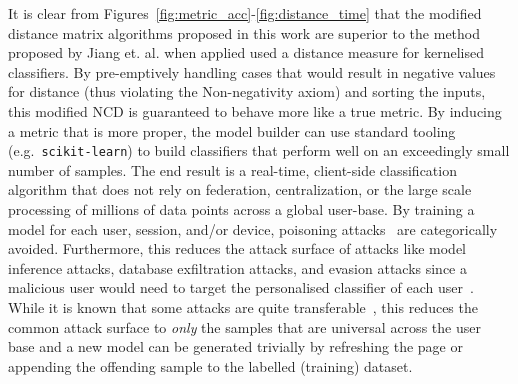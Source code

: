 \documentclass[preprint,12pt]{elsarticle}
\begin{document}
It is clear from Figures~\ref{fig:metric_acc}-\ref{fig:distance_time} that the modified distance matrix algorithms proposed in this work are superior to the method proposed by Jiang et. al. when applied used a distance measure for kernelised classifiers. 
By pre-emptively handling cases that would result in negative values for distance (thus violating the Non-negativity axiom) and sorting the inputs, this modified NCD is guaranteed to behave more like a true metric. 
By inducing a metric that is more proper, the model builder can use standard tooling (e.g.~\texttt{scikit-learn}) to build classifiers that perform well on an exceedingly small number of samples. 
The end result is a real-time, client-side classification algorithm that does not rely on federation, centralization, or the large scale processing of millions of data points across a global user-base. 
By training a model for each user, session, and/or device, poisoning attacks~\cite{biggio_poisoning_2013} are categorically avoided. 
Furthermore, this reduces the attack surface of attacks like model inference attacks, database exfiltration attacks, and evasion attacks since a malicious user would need to target the personalised classifier of each user~\cite{biggio_evasion_2013,deepfool,chakraborty_adversarial_2018}. 
While it is known that some attacks are quite transferable~\cite{wang2021enhancing}, this reduces the common attack surface to \textit{only} the samples that are universal across the user base and a new model can be generated trivially by refreshing the page or appending the offending sample to the labelled (training) dataset. 



  
 





\end{document}
